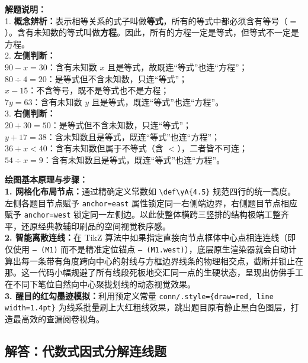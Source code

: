 \vspace{0.6cm}

{\small\color{gray}
\textbf{解题说明：}\\
1. \textbf{概念辨析：}表示相等关系的式子叫做\textbf{等式}，所有的等式中都必须含有等号（$=$）。含有未知数的等式叫做\textbf{方程}。因此，所有的方程一定是等式，但等式不一定是方程。\\
2. \textbf{左侧判断：}\\
\quad $90-x=30$：含有未知数 $x$ 且是等式，故既连“等式”也连“方程”；\\
\quad $80\div4=20$：是等式但不含未知数，只连“等式”；\\
\quad $x-15$：不含等号，既不是等式也不是方程；\\
\quad $7y=63$：含有未知数 $y$ 且是等式，既连“等式”也连“方程”。\\
3. \textbf{右侧判断：}\\
\quad $20+30=50$：是等式但不含未知数，只连“等式”；\\
\quad $y+17=38$：含未知数且是等式，既连“等式”也连“方程”；\\
\quad $36+x<40$：含有未知数但属于不等式（含 $<$），二者皆不可连；\\
\quad $54\div x=9$：含有未知数且是等式，既连“等式”也连“方程”。
}

\vspace{0.6cm}

{\small\color{blue!70!black}
\textbf{绘图基本原理与步骤：}\\
\textbf{1. 网格化布局节点：}通过精确定义常数如 \texttt{\textbackslash def\textbackslash yA\{4.5\}} 规范四行的统一高度。左侧各题目节点赋予 \texttt{anchor=east} 属性锁定同一右侧端边界，右侧题目节点相应赋予 \texttt{anchor=west} 锁定同一左侧边。以此使整体横跨三竖排的结构极端工整齐平，还原经典教辅印刷品的空间视觉秩序感。\\
\textbf{2. 智能离散连线：}在 TikZ 算法中如果指定直接向节点框体中心点相连连线（即仅使用 \texttt{-- (M1)} 而不是精准定位锚点 \texttt{-- (M1.west)}），底层原生渲染器就会自动计算出每一条带有角度跨向中心的射线与方框边界线条的物理相交点，截断并锁止在那。这一代码小幅规避了所有线段死板地交汇同一点的生硬状态，呈现出仿佛手工在不同下笔位自然向中心聚拢划线的动态视觉效果。\\
\textbf{3. 醒目的红勾墨迹模拟：}利用预定义常量 \texttt{conn/.style=\{draw=red, line width=1.4pt\}} 为线系批量刷上大红粗线效果，跳出题目原有静止黑白色图层，打造最高效的查漏阅卷视角。
}

\newpage

\subsection{解答：代数式因式分解连线题}


